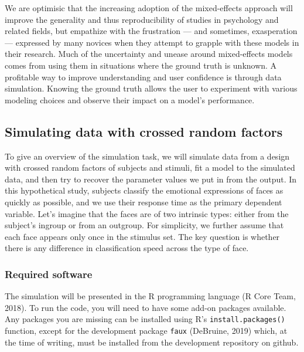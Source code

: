 \documentclass[man,floatsintext]{apa6}
\begin{document}
We are optimisic that the increasing adoption of the mixed-effects approach will improve the generality and thus reproducibility of studies in psychology and related fields, but empathize with the frustration --- and sometimes, exasperation --- expressed by many novices when they attempt to grapple with these models in their research. Much of the uncertainty and unease around mixed-effects models comes from using them in situations where the ground truth is unknown. A profitable way to improve understanding and user confidence is through data simulation. Knowing the ground truth allows the user to experiment with various modeling choices and observe their impact on a model's performance.

\hypertarget{simulating-data-with-crossed-random-factors}{%
\subsection{Simulating data with crossed random factors}\label{simulating-data-with-crossed-random-factors}}

To give an overview of the simulation task, we will simulate data from a design with crossed random factors of subjects and stimuli, fit a model to the simulated data, and then try to recover the parameter values we put in from the output. In this hypothetical study, subjects classify the emotional expressions of faces as quickly as possible, and we use their response time as the primary dependent variable. Let's imagine that the faces are of two intrinsic types: either from the subject's ingroup or from an outgroup. For simplicity, we further assume that each face appears only once in the stimulus set. The key question is whether there is any difference in classification speed across the type of face.

\hypertarget{required-software}{%
\subsubsection{Required software}\label{required-software}}

The simulation will be presented in the R programming language (R Core Team, 2018). To run the code, you will need to have some add-on packages available. Any packages you are missing can be installed using R's \texttt{install.packages()} function, except for the development package \texttt{faux} (DeBruine, 2019) which, at the time of writing, must be installed from the development repository on github.
\end{document}
